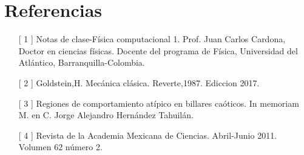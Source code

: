 \documentclass[11pt,letterpaper,twocolumn]{article}
\begin{document}
\section*{Referencias} 
\begin{itemize} 
\item[[ 1]] Notas de clase-Física computacional 1. Prof. Juan Carlos Cardona, Doctor en ciencias físicas. Docente del programa de Física, Universidad del Atlántico, Barranquilla-Colombia. 

\item[[ 2]] Goldstein,H. Mecánica clásica. Reverte,1987. Ediccion 2017.

\item[[ 3]] Regiones de comportamiento atípico en billares caóticos. In memoriam M. en C. Jorge Alejandro Hernández Tahuilán. 

\item[[ 4]] Revista de la Academia Mexicana de Ciencias. Abril-Junio 2011. Volumen 62 número 2.
\end{itemize}
\end{document}
